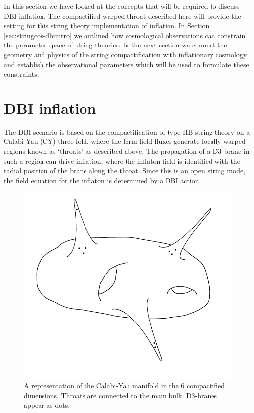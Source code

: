 In this section we have looked at the concepts that will be
required to discuss DBI inflation. The compactified warped throat described
here will provide the setting for this string theory implementation of
inflation. In Section \ref{sec:stringcos-dbiintro} we outlined how cosmological
observations can constrain the parameter space of string theories. In the next
section we connect the geometry and physics of the string compactification with
inflationary cosmology and establish the observational parameters which will be
used to formulate these constraints. 

% 
% 
\section{DBI inflation} 
% 
\label{sec:dbiinflation}
The DBI scenario is based on the compactification of type IIB string theory on a 
Calabi-Yau (CY) three-fold, where the form-field fluxes generate locally
warped regions known as `throats' as described above.  The propagation of a 
${\rm D3}$-brane in such a region can drive inflation, where the inflaton 
field is identified with the radial position of the brane 
along the throat. Since this is an open string mode, the field 
equation for the inflaton is determined by a DBI action.

% 
\begin{figure}
 \centering
 \includegraphics[width=\textwidth]{dbi/graphs/cymanifold}
 \caption[Calabi-Yau Manifold]{A representation of the Calabi-Yau manifold in the 6
compactified
dimensions. Throats are connected to the main bulk. D3-branes appear as dots.}
 \label{fig:braneworld}
\end{figure}
% 


